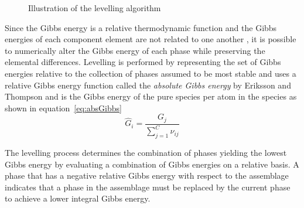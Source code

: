 \begin{figure}[htb]
  		\caption{Illustration of the levelling algorithm \cite{Loukusa:2014aa}}
  		\label{fig:levelling}
 	\end{figure}

	Since the Gibbs energy is a relative thermodynamic function and the Gibbs energies of each component element are not related to one another \cite{Eriksson89}, it is possible to numerically alter the Gibbs energy of each phase while preserving the elemental differences. Levelling is performed by representing the set of Gibbs energies relative to the collection of phases assumed to be most stable and uses a relative Gibbs energy function called the \textit{absolute Gibbs energy} by Eriksson and Thompson and is the Gibbs energy of the pure species per atom in the species as shown in equation~\eqref{eq:absGibbs}
	\begin{equation}\label{eq:absGibbs}
		\hat{G}_i = \frac{G_j}{\sum_{j=1}^C \nu_{ij}}
	\end{equation}

	The levelling process determines the combination of phases yielding the lowest Gibbs energy by evaluating a combination of Gibbs energies on a relative basis. A phase that has a negative relative Gibbs energy with respect to the assemblage indicates that a phase in the assemblage must be replaced by the current phase to achieve a lower integral Gibbs energy.

